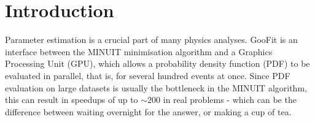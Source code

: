\section{Introduction}
\label{sec:intro}

Parameter estimation is a crucial part of many physics analyses. 
GooFit is an interface between the MINUIT minimisation algorithm
and a Graphics Processing Unit (GPU), which allows a probability
density function (PDF) to be evaluated in parallel, that is, for
several hundred events at once. Since PDF evaluation on large datasets
is usually the bottleneck in the MINUIT algorithm, this can result
in speedups of up to $\sim 200$ in real problems - which can be the
difference between waiting overnight for the answer, or making a cup
of tea. 


